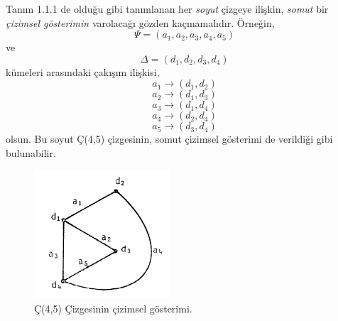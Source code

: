 \documentclass[11pt]{amsbook}
\begin{document}

Tanım 1.1.1 de olduğu gibi tanımlanan her \emph{soyut} çizgeye ilişkin, \emph{somut} bir \emph{çizimsel gösterimin} varolacağı gözden kaçmamalıdır. 
Örneğin, $$\Psi = (a_1,a_2,a_3,a_4,a_5)$$ ve $$\Delta = (d_1,d_2,d_3,d_4)$$ kümeleri arasındaki çakışım ilişkisi,
 $$ a_1 \rightarrow (d_1,d_2)$$ $$ a_2 \rightarrow (d_1,d_3)$$ $$ a_3 \rightarrow (d_1,d_4)$$ $$ a_4 \rightarrow (d_2,d_4)$$ 
$$ a_5 \rightarrow (d_3,d_4)$$ olsun. Bu soyut Ç(4,5) çizgesinin, somut çizimsel gösterimi  de verildiği gibi bulunabilir.
\begin{figure}[htb]
	\centering
	\includegraphics[width=0.45\textwidth]{images/ceyhun-002-fig01}
	\caption{Ç(4,5) Çizgesinin çizimsel gösterimi.}
	\label{fig:1.1.1}
\end{figure}
\end{document}
